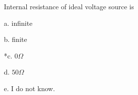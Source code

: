 
Internal resistance of ideal voltage source is

a. infinite

b. finite

*c. \( 0 \Omega \)  

d. \( 50 \Omega \)

e. I do not know.\\
